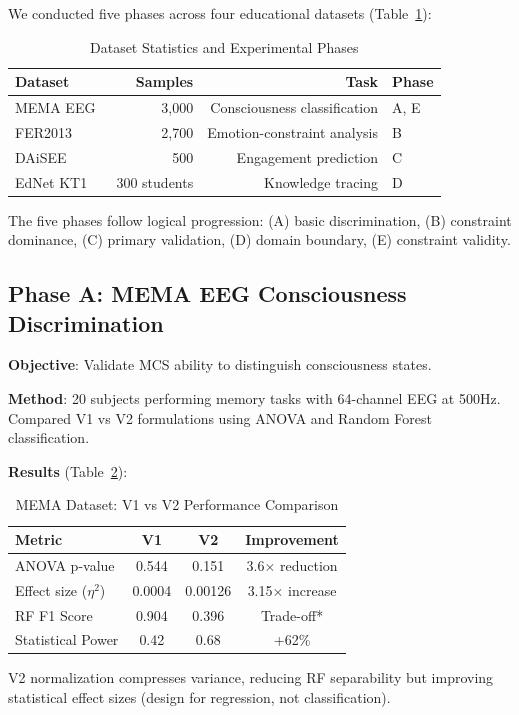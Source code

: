 \documentclass[10pt,journal,compsoc]{IEEEtran}
\begin{document}
We conducted five phases across four educational datasets (Table~\ref{tab:datasets}):

\begin{table}[!t]
\renewcommand{\arraystretch}{1.3}
\caption{Dataset Statistics and Experimental Phases}
\label{tab:datasets}
\centering
\small
\begin{tabular}{lrrp{1.0in}}
\toprule
\textbf{Dataset} & \textbf{Samples} & \textbf{Task} & \textbf{Phase} \\
\midrule
MEMA EEG~\cite{mema} & 3,000 & Consciousness classification & A, E \\
FER2013~\cite{fer2013} & 2,700 & Emotion-constraint analysis & B \\
DAiSEE~\cite{gupta2016} & 500 & Engagement prediction & C \\
EdNet KT1~\cite{ednet} & 300 students & Knowledge tracing & D \\
\bottomrule
\end{tabular}
\end{table}

The five phases follow logical progression: (A) basic discrimination, (B) constraint dominance, (C) primary validation, (D) domain boundary, (E) constraint validity.

\subsection{Phase A: MEMA EEG Consciousness Discrimination}

\textbf{Objective}: Validate MCS ability to distinguish consciousness states.

\textbf{Method}: 20 subjects performing memory tasks with 64-channel EEG at 500Hz. Compared V1 vs V2 formulations using ANOVA and Random Forest classification.

\textbf{Results} (Table~\ref{tab:mema_results}):

\begin{table}[!t]
\renewcommand{\arraystretch}{1.3}
\caption{MEMA Dataset: V1 vs V2 Performance Comparison}
\label{tab:mema_results}
\centering
\begin{tabular}{lccc}
\toprule
\textbf{Metric} & \textbf{V1} & \textbf{V2} & \textbf{Improvement} \\
\midrule
ANOVA p-value & 0.544 & 0.151 & 3.6$\times$ reduction \\
Effect size ($\eta^2$) & 0.0004 & 0.00126 & 3.15$\times$ increase \\
RF F1 Score & 0.904 & 0.396 & Trade-off* \\
Statistical Power & 0.42 & 0.68 & +62\% \\
\bottomrule
\end{tabular}
\begin{flushleft}
\small *V2 normalization compresses variance, reducing RF separability but improving statistical effect sizes (design for regression, not classification).
\end{flushleft}
\end{table}
\end{document}
